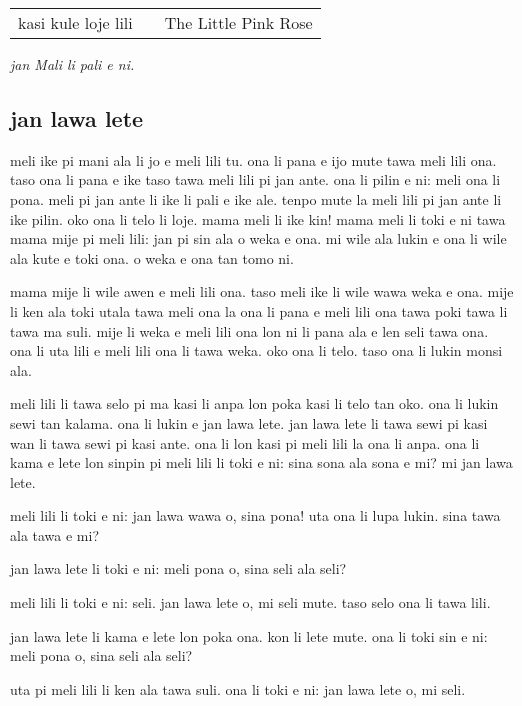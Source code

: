 \begin{supertabular}{p{5,5cm}|ll}
kasi kule loje lili  && The Little Pink Rose \\
\end{supertabular}

\textit{jan Mali li pali e ni. \cite{www:astrodonunt:01}}
%
\newpage
\subsection{jan lawa lete}

meli ike pi mani ala li jo e meli lili tu. 
ona li pana e ijo mute tawa meli lili ona. 
taso ona li pana e ike taso tawa meli lili pi jan ante. 
ona li pilin e ni: meli ona li pona. 
meli pi jan ante li ike li pali e ike ale. 
tenpo mute la meli lili pi jan ante li ike pilin. 
oko ona li telo li loje. 
mama meli li ike kin! 
mama meli li toki e ni tawa mama mije pi meli lili: 
\glqq jan pi sin ala o weka e ona. 
mi wile ala lukin e ona li wile ala kute e toki ona. 
o weka e ona tan tomo ni.\grqq

mama mije li wile awen e meli lili ona. 
taso meli ike li wile wawa weka e ona. 
mije li ken ala toki utala tawa meli ona la ona li pana e meli lili ona tawa poki tawa li tawa ma suli. 
mije li weka e meli lili ona lon ni li pana ala e len seli tawa ona. 
ona li uta lili e meli lili ona li tawa weka. 
oko ona li telo. 
taso ona li lukin monsi ala.

meli lili li tawa selo pi ma kasi li anpa lon poka kasi li telo tan oko. 
ona li lukin sewi tan kalama. 
ona li lukin e jan lawa lete. 
jan lawa lete li tawa sewi pi kasi wan li tawa sewi pi kasi ante.
ona li lon kasi pi meli lili la ona li anpa. 
ona li kama e lete lon sinpin pi meli lili li toki e ni: 
\glqq sina sona ala sona e mi? 
mi jan lawa lete.\grqq

meli lili li toki e ni: 
\glqq jan lawa wawa o, sina pona!\grqq 
uta ona li lupa lukin. 
\glqq sina tawa ala tawa e mi?\grqq

jan lawa lete li toki e ni: 
\glqq meli pona o, sina seli ala seli?\grqq

meli lili li toki e ni: 
\glqq seli. 
jan lawa lete o, mi seli mute.\grqq
taso selo ona li tawa lili.

jan lawa lete li kama e lete lon poka ona. 
kon li lete mute. 
ona li toki sin e ni: 
\glqq meli pona o, sina seli ala seli?\grqq

uta pi meli lili li ken ala tawa suli. 
ona li toki e ni: 
\glqq jan lawa lete o, mi seli.\grqq


